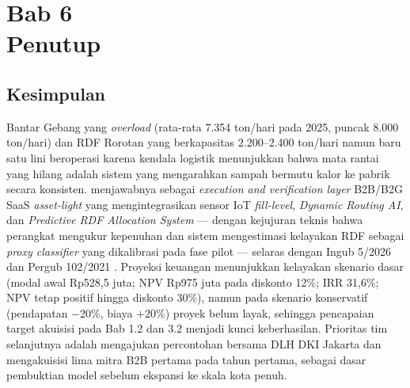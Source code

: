 \section{Bab 6\\Penutup}

\subsection{Kesimpulan}
\label{sec:6-1}

Bantar Gebang yang \textit{overload} (rata-rata \textpm{}7.354 ton/hari pada 2025, puncak \textpm{}8.000 ton/hari) dan RDF Rorotan yang berkapasitas 2.200--2.400 ton/hari namun baru satu lini beroperasi karena kendala logistik \parencite{dlhjakarta2026,kompasrorotan2026} menunjukkan bahwa mata rantai yang hilang adalah sistem yang mengarahkan sampah bermutu kalor ke pabrik secara konsisten. \ProductName{} menjawabnya sebagai \textit{execution and verification layer} B2B/B2G SaaS \textit{asset-light} yang mengintegrasikan sensor IoT \textit{fill-level}, \textit{Dynamic Routing AI}, dan \textit{Predictive RDF Allocation System} --- dengan kejujuran teknis bahwa perangkat mengukur kepenuhan dan sistem mengestimasi kelayakan RDF sebagai \textit{proxy classifier} yang dikalibrasi pada fase pilot --- selaras dengan Ingub 5/2026 dan Pergub 102/2021 \parencite{ingub5_2026,pergub102}. Proyeksi keuangan menunjukkan kelayakan skenario dasar (modal awal \textpm{}Rp528,5 juta; NPV \textpm{}Rp975 juta pada diskonto 12\%; IRR \textpm{}31,6\%; NPV tetap positif hingga diskonto 30\%), namun pada skenario konservatif (pendapatan $-$20\%, biaya $+$20\%) proyek belum layak, sehingga pencapaian target akuisisi pada Bab 1.2 dan 3.2 menjadi kunci keberhasilan. Prioritas tim selanjutnya adalah mengajukan percontohan bersama DLH DKI Jakarta dan mengakuisisi lima mitra B2B pertama pada tahun pertama, sebagai dasar pembuktian model sebelum ekspansi ke skala kota penuh.

